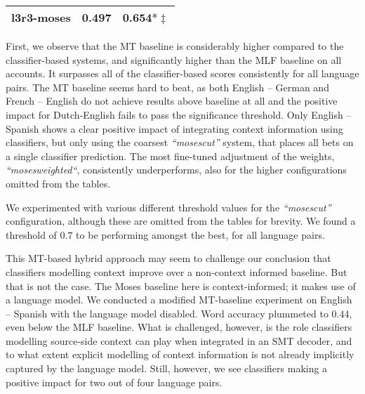 \begin{table}[htb]
{\begin{tabular}{lrr}
l3r3-moses & 0.497 & 0.654$*\ddagger$ \\%
\hline
\end{tabular}}
\end{table}

First, we observe that the MT baseline is considerably higher compared to the
classifier-based systems, and significantly higher than the MLF baseline on all
accounts. It surpasses all of the classifier-based scores consistently for all
language pairs. The MT baseline seems hard to beat, as both English -- German
and French -- English do not achieve results above baseline at all and the
positive impact for Dutch-English fails to pass the significance threshold.
Only English -- Spanish shows a clear positive impact of integrating context
information using classifiers, but only using the coarsest \emph{``mosescut''}
system, that places all bets on a single classifier prediction. The most
fine-tuned adjustment of the weights, \emph{``mosesweighted``}, consistently
underperforms, also for the higher configurations omitted from the tables.

We experimented with various different threshold values for the \emph{``mosescut''}
configuration, although these are omitted from the tables for brevity. We found
a threshold of $0.7$ to be performing amongst the best, for all language pairs.

This MT-based hybrid approach may seem to challenge our conclusion that classifiers
modelling context improve over a non-context informed baseline. But that is not
the case. The Moses baseline here is context-informed; it makes use of
a language model. We conducted a modified MT-baseline experiment on
English -- Spanish with the language model disabled. Word accuracy plummeted to
$0.44$, even below the MLF baseline. What is challenged, however, is the role
classifiers modelling source-side context can play when integrated in an SMT
decoder, and to what extent explicit modelling of context information is not
already implicitly captured by the language model. Still, however, we see
classifiers making a positive impact for two out of four language pairs.

